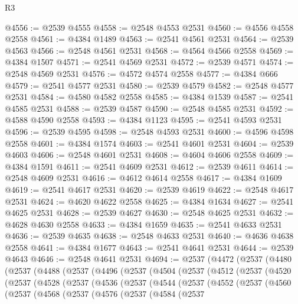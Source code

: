 \begin{lexlean}{R3}
\begin{coremodule}
@4556 := @2539 @4555
@4558 := @2548 @4553 @2531
@4560 := @4556 @4558 @2558
@4561 := @4384 @1489
@4563 := @2541 @4561 @2531
@4564 := @2539 @4563
@4566 := @2548 @4561 @2531
@4568 := @4564 @4566 @2558
@4569 := @4384 @1507
@4571 := @2541 @4569 @2531
@4572 := @2539 @4571
@4574 := @2548 @4569 @2531
@4576 := @4572 @4574 @2558
@4577 := @4384 @666
@4579 := @2541 @4577 @2531
@4580 := @2539 @4579
@4582 := @2548 @4577 @2531
@4584 := @4580 @4582 @2558
@4585 := @4384 @1539
@4587 := @2541 @4585 @2531
@4588 := @2539 @4587
@4590 := @2548 @4585 @2531
@4592 := @4588 @4590 @2558
@4593 := @4384 @1123
@4595 := @2541 @4593 @2531
@4596 := @2539 @4595
@4598 := @2548 @4593 @2531
@4600 := @4596 @4598 @2558
@4601 := @4384 @1574
@4603 := @2541 @4601 @2531
@4604 := @2539 @4603
@4606 := @2548 @4601 @2531
@4608 := @4604 @4606 @2558
@4609 := @4384 @1591
@4611 := @2541 @4609 @2531
@4612 := @2539 @4611
@4614 := @2548 @4609 @2531
@4616 := @4612 @4614 @2558
@4617 := @4384 @1609
@4619 := @2541 @4617 @2531
@4620 := @2539 @4619
@4622 := @2548 @4617 @2531
@4624 := @4620 @4622 @2558
@4625 := @4384 @1634
@4627 := @2541 @4625 @2531
@4628 := @2539 @4627
@4630 := @2548 @4625 @2531
@4632 := @4628 @4630 @2558
@4633 := @4384 @1659
@4635 := @2541 @4633 @2531
@4636 := @2539 @4635
@4638 := @2548 @4633 @2531
@4640 := @4636 @4638 @2558
@4641 := @4384 @1677
@4643 := @2541 @4641 @2531
@4644 := @2539 @4643
@4646 := @2548 @4641 @2531
@4694 := @2537
    (@4472
      (@2537
        (@4480
          (@2537
            (@4488
              (@2537
                (@4496
                  (@2537
                    (@4504
                      (@2537
                        (@4512
                          (@2537
                            (@4520
                              (@2537
                                (@4528
                                  (@2537
                                    (@4536
                                      (@2537
                                        (@4544
                                          (@2537
                                            (@4552
                                              (@2537
                                                (@4560
                                                  (@2537
                                                    (@4568
                                                      (@2537
                                                        (@4576
                                                          (@2537
                                                            (@4584
                                                              (@2537

\end{coremodule}
\end{lexlean}
